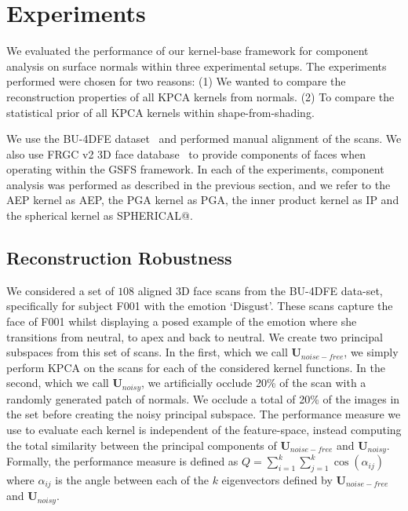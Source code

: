 \section{Experiments}\label{sec:experiments}
We evaluated the performance of our kernel-base framework for component analysis 
on surface normals within three experimental setups. The experiments performed 
were chosen for two reasons: (1) We wanted to compare the reconstruction 
properties of all KPCA kernels from normals. (2) To compare the statistical 
prior of all KPCA kernels within shape-from-shading. 

We use the BU-4DFE dataset~\cite{RefWorks:104} and performed manual alignment 
of the scans. We also use FRGC v2 3D face database~\cite{RefWorks:251} to 
provide components of faces when operating within the GSFS framework. In each 
of the experiments, component analysis was performed as described in the 
previous section, and we refer to the AEP kernel as AEP, the PGA kernel as 
PGA, the inner product kernel as IP and the spherical kernel as SPHERICAL@.
\subsection{Reconstruction Robustness}\label{subsec:Q}
We considered a set of $108$ aligned 3D face scans from the BU-4DFE data-set, 
specifically for subject F001 with the emotion `Disgust'. These scans capture 
the face of F001 whilst displaying a posed example of the emotion where she 
transitions from neutral, to apex and back to neutral. We create two principal 
subspaces from this set of scans. In the first, which we call 
$\boldsymbol{U}_{noise-free}$, we simply perform KPCA on the scans for each of 
the considered kernel functions. In the second, which we call 
$\boldsymbol{U}_{noisy}$, we artificially occlude 20\% of the scan with a 
randomly generated patch of normals. We occlude a total of 20\% of the images 
in the set before creating the noisy principal subspace. The performance 
measure we use to evaluate each kernel is independent of the feature-space, 
instead computing the total similarity between the principal components of 
$\boldsymbol{U}_{noise-free}$ and $\boldsymbol{U}_{noisy}$. Formally, the 
performance measure is defined as 
$Q = \sum_{i=1}^k \sum_{j=1}^k \cos(\alpha_{ij})$ where $\alpha_{ij}$ is the 
angle between each of the $k$ eigenvectors defined by
 $\boldsymbol{U}_{noise-free}$ and $\boldsymbol{U}_{noisy}$. 

